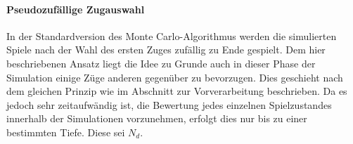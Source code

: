 \paragraph{Pseudozufällige Zugauswahl}
In der Standardversion des Monte Carlo-Algorithmus werden die simulierten Spiele nach der Wahl des ersten Zuges zufällig zu Ende gespielt. Dem hier beschriebenen Ansatz liegt die Idee zu Grunde auch in dieser Phase der Simulation einige Züge anderen gegenüber zu bevorzugen. Dies geschieht nach dem gleichen Prinzip wie im Abschnitt zur Vorverarbeitung beschrieben. Da es jedoch sehr zeitaufwändig ist, die Bewertung jedes einzelnen Spielzustandes innerhalb der Simulationen vorzunehmen, erfolgt dies nur bis zu einer bestimmten Tiefe. Diese sei $N_{d}$.